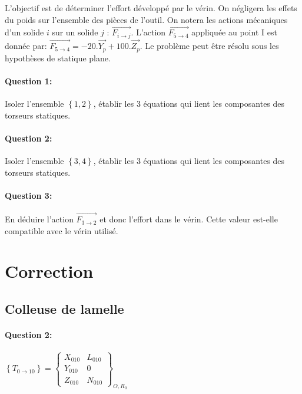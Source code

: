 L'objectif est de déterminer l'effort développé par le vérin. On négligera les effets du poids sur l'ensemble des pièces de l'outil. On notera les actions mécaniques d'un solide $i$ sur un solide $j$ : $\overrightarrow{F_{i\rightarrow j}}$. L'action  $\overrightarrow{F_{5\rightarrow 4}}$ appliquée au point I est donnée par: $\overrightarrow{F_{5\rightarrow 4}}=-20.\overrightarrow{Y_p}+100.\overrightarrow{Z_p}$. Le problème peut être résolu sous les hypothèses de statique plane. 
 
\paragraph{Question 1:} Isoler l'ensemble $\left\{1,2\right\}$, établir les 3 équations qui lient les composantes des torseurs statiques.

\paragraph{Question 2:} Isoler l'ensemble $\left\{3,4\right\}$, établir les 3 équations qui lient les composantes des torseurs statiques.
 
\paragraph{Question 3:} En déduire l'action $\overrightarrow{F_{3\rightarrow 2}}$ et donc l'effort dans le vérin. Cette valeur est-elle compatible avec le vérin utilisé.

\ifdef{\public}{}{}

\clearpage

\newpage

\section{Correction}

\subsection{Colleuse de lamelle}

\paragraph{Question 2:} 

$\left\{T_{0\rightarrow 10}\right\}=\left\{
\begin{array}{cc}
X_{010} & L_{010} \\
Y_{010} & 0 \\
Z_{010} & N_{010}
\end{array}
\right\}_{O,R_0}$

